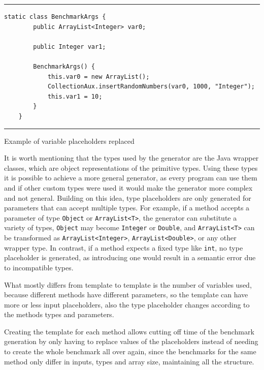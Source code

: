 \begin{listing}[htbp]
\noindent\rule{\linewidth}{0.4pt}
\begin{verbatim}
static class BenchmarkArgs {
        public ArrayList<Integer> var0;

        public Integer var1;

        BenchmarkArgs() {
            this.var0 = new ArrayList();
            CollectionAux.insertRandomNumbers(var0, 1000, "Integer");
            this.var1 = 10;
        }
    }
\end{verbatim}
\noindent\rule{\linewidth}{0.4pt}
\caption{Example of variable placeholders replaced}            
\label{lst:var_placeholders_replaced}
\end{listing}



It is worth mentioning that the types used by the generator are the Java wrapper classes, which are object representations of the primitive types. Using these types it is possible to achieve a more general generator, as every program can use them and if other custom types were used it would make the generator more complex and not general. {\color{blue}Building on this idea, type placeholders are only generated for parameters that can accept multiple types. For example, if a method accepts a parameter of type \texttt{Object} or \texttt{ArrayList<T>}, the generator can substitute a variety of types, \texttt{Object} may become \texttt{Integer} or \texttt{Double}, and \texttt{ArrayList<T>} can be transformed as \texttt{ArrayList<Integer>}, \texttt{ArrayList<Double>}, or any other wrapper type. In contrast, if a method expects a fixed type like \texttt{int}, no type placeholder is generated, as introducing one would result in a semantic error due to incompatible types.}

What mostly differs from template to template is the number of variables used, because different methods have different parameters, so the template can have more or less input placeholders, also the type placeholder changes according to the methods types and parameters.


Creating the template for each method allows cutting off time of the benchmark generation by only having to replace values of the placeholders instead of needing to create the whole benchmark all over again, since the benchmarks for the same method only differ in inputs, types and array size, maintaining all the structure.

